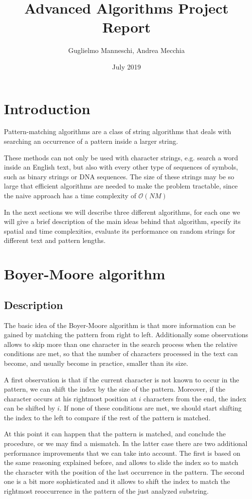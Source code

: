 \documentclass{article}
\title{Advanced Algorithms Project Report}
\author{Guglielmo Manneschi, Andrea Mecchia}
\date{July 2019}
\begin{document}
\maketitle

\section{Introduction}
Pattern-matching algorithms are a class of string algorithms that deals with searching an occurrence of a pattern inside a larger string.

These methods can not only be used with character strings, e.g. search a word inside an English text, but also with every other type of sequences of symbols, such as binary strings or DNA sequences. The size of these strings may be so large that efficient algorithms are needed to make the problem tractable, since the naive approach has a time complexity of $\mathcal{O}(NM)$

In the next sections we will describe three different algorithms, for each one we will give a brief description of the main ideas behind that algorithm, specify its spatial and time complexities, evaluate its performance on random strings for different text and pattern lengths.

\section{Boyer-Moore algorithm}

\subsection{Description}
The basic idea of the Boyer-Moore algorithm is that more information can be gained by matching the pattern from right to left. Additionally some observations allows to skip more than one character in the search process when the relative conditions are met, so that the number of characters processed in the text can become, and usually become in practice, smaller than its size.

A first observation is that if the current character is not known to occur in the pattern, we can shift the index by the size of the pattern. Moreover, if the character occurs at his rightmost position at $i$ characters from the end, the index can be shifted by $i$. If none of these conditions are met, we should start shifting the index to the left to compare if the rest of the pattern is matched.

At this point it can happen that the pattern is matched, and conclude the procedure, or we may find a mismatch. In the latter case there are two additional performance improvements that we can take into account. The first is based on the same reasoning explained before, and allows to slide the index so to match the character with the position of the last occurrence in the pattern. The second one is a bit more sophisticated and it allows to shift the index to match the rightmost reoccurrence in the pattern of the just analyzed substring.
\end{document}
